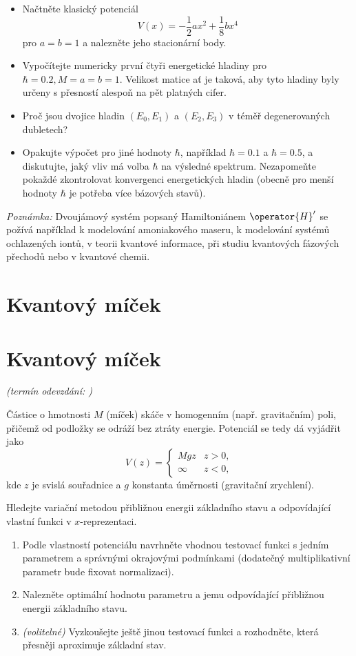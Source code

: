 \documentclass[a4paper,11pt,twoside]{book}
\def\np{\newpage}
\newcommand{\exercise}[2][]{\ifthenelse{\isempty{#1}}
	{\np\section{#2}}
	{\np\section{#2}\small{\it{(termín odevzdání: {#1})}\newline}}
}
\begin{document}
\begin{enumerate}
        \begin{itemize}
        \item 
            Načtněte klasický potenciál
            \begin{equation*}
                V(x)=-\frac{1}{2}ax^{2}+\frac{1}{8}bx^{4}
            \end{equation*}
            pro $a=b=1$ a nalezněte jeho stacionární body.
        \item 
            Vypočítejte numericky první čtyři energetické hladiny pro $\hbar=0.2,M=a=b=1$.
            Velikost matice ať je taková, aby tyto hladiny byly určeny s přesností alespoň na pět platných cifer.
        \item 
            Proč jsou dvojice hladin $(E_{0}, E_{1})$ a $(E_{2}, E_{3})$ v téměř degenerovaných dubletech?        
        \item 
            Opakujte výpočet pro jiné hodnoty $\hbar$, například $\hbar=0.1$ a $\hbar=0.5$, a diskutujte, jaký vliv má volba $\hbar$ na výsledné spektrum.
            Nezapomeňte pokaždé zkontrolovat konvergenci energetických hladin (obecně pro menší hodnoty $\hbar$ je potřeba více bázových stavů).
        \end{itemize}		
        
        \emph{Poznámka:} Dvoujámový systém popsaný Hamiltoniánem $\operator{H}'$ se požívá například k modelování amoniakového maseru, k modelování systémů ochlazených iontů, v teorii kvantové informace, při studiu kvantových fázových přechodů nebo v kvantové chemii.
            
    \end{enumerate}

\exercise{Kvantový míček}
    Částice o hmotnosti $M$ (míček) skáče v homogenním (např. gravitačním) poli, přičemž od podložky se odráží bez ztráty energie.
    Potenciál se tedy dá vyjádřit jako
    \begin{equation*}
        V(z)=
        \begin{cases}
        Mgz & z > 0, \\
        \infty & z < 0,
        \end{cases}
    \end{equation*}
    kde $z$ je svislá souřadnice a $g$ konstanta úměrnosti (gravitační zrychlení).

    Hledejte variační metodou přibližnou energii základního stavu a odpovídající vlastní funkci v $x$-reprezentaci.
    \begin{enumerate}
        \item 
            Podle vlastností potenciálu navrhněte vhodnou testovací funkci s jedním parametrem a správnými okrajovými podmínkami (dodatečný multiplikativní parametr bude fixovat normalizaci).

        \item 
            Nalezněte optimální hodnotu parametru a jemu odpovídající přibližnou energii základního stavu.

        \item 
            \emph{(volitelné)} Vyzkoušejte ještě jinou testovací funkci a rozhodněte, která přesněji aproximuje základní stav.
    \end{enumerate}	
\end{document}
